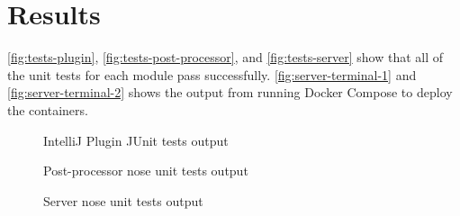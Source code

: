 \section{Results}
\autoref{fig:tests-plugin}, \autoref{fig:tests-post-processor}, and \autoref{fig:tests-server} show that all of the unit tests for each module pass successfully. \autoref{fig:server-terminal-1} and \autoref{fig:server-terminal-2} shows the output from running Docker Compose to deploy the containers.

\begin{figure}[H]
  \centering
  \caption[Plugin tests]{IntelliJ Plugin JUnit tests output}
  \label{fig:tests-plugin}
\end{figure}

\begin{figure}[H]
  \centering
  \caption[Post-processor tests]{Post-processor nose unit tests output}
  \label{fig:tests-post-processor}
\end{figure}

\begin{figure}[H]
  \centering
  \caption[Server tests]{Server nose unit tests output}
  \label{fig:tests-server}
\end{figure}

